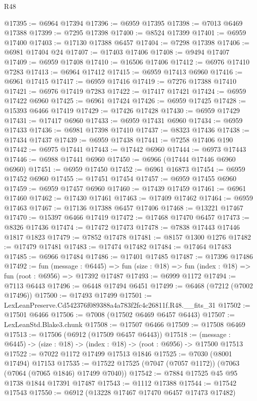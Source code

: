\begin{lexlean}{R48}
\begin{coremodule}
@17395 := @6964 @17394
@17396 := @6959 @17395
@17398 := @7013 @6469 @17388
@17399 := @7295 @17398
@17400 := @8524 @17399
@17401 := @6959 @17400
@17403 := @17130 @17388 @6457
@17404 := @7298 @17398
@17406 := @6981 @17404 @24
@17407 := @17403 @17406
@17408 := @9494 @17407
@17409 := @6959 @17408
@17410 := @16506 @17406
@17412 := @6976 @17410 @7283
@17413 := @6964 @17412
@17415 := @6959 @17413 @6960
@17416 := @6961 @17415
@17417 := @6959 @17416
@17419 := @7276 @17388 @17410
@17421 := @6976 @17419 @7283
@17422 := @17417 @17421
@17424 := @6959 @17422 @6960
@17425 := @6961 @17424
@17426 := @6959 @17425
@17428 := @15393 @6466 @17419
@17429 := @17426 @17428
@17430 := @6959 @17429
@17431 := @17417 @6960
@17433 := @6959 @17431 @6960
@17434 := @6959 @17433
@17436 := @6981 @17398 @17410
@17437 := @8323 @17436
@17438 := @17434 @17437
@17439 := @6959 @17438
@17441 := @7258 @17406 @190
@17442 := @6975 @17441
@17443 := @17442 @6960
@17444 := @6973 @17443
@17446 := @6988 @17441 @6960
@17450 := @6966 (@17444 @17446 @6960 @6960)
@17451 := @6959 @17450
@17452 := @6961 @16873
@17454 := @6959 @17452 @6960
@17455 := @17451 @17454
@17457 := @6959 @17455 @6960
@17459 := @6959 @17457 @6960
@17460 := @17439 @17459
@17461 := @6961 @17460
@17462 := @17430 @17461
@17463 := @17409 @17462
@17464 := @6959 @17463
@17467 := @17136 @17388 @6457 @17406
@17468 := @13221 @17467
@17470 := @15397 @6466 @17419
@17472 := @17468 @17470 @6457
@17473 := @8326 @17436
@17474 := @17472 @17473
@17478 := @7838 @17443 @17446 @1817 @1823
@17479 := @7852 @17478
@17481 := @8157 @1300 @1276
@17482 := @17479 @17481
@17483 := @17474 @17482
@17484 := @17464 @17483
@17485 := @6966 @17484
@17486 := @17401 @17485
@17487 := @17396 @17486
@17492 := fun (message : @6445) =>
  fun (size : @18) => fun (index : @18) => fun (root : @6956) => @17392 @17487
@17493 := @6999 @1172
@17494 := @7113 @6443
@17496 := @6448 @17494 @6451
@17499 := @6468 (@7212 (@7002 @17496))
@17500 := @17493 @17499
@17501 := LexLeanPreserve.Cd542376f089388a4a783f2fc4c26811f.R48.__fits_31
@17502 := @17501 @6466
@17506 := @7008 (@17502 @6469 @6457 @6443)
@17507 := LexLeanStd.Blake3.chunk
@17508 := @17507 @6466
@17509 := @17508 @6469
@17513 := @17506 (@6912 (@17509 @6457 @6443))
@17518 := (message : @6445) -> (size : @18) -> (index : @18) -> (root : @6956) -> @17500 @17513
@17522 := @7022 @1172 @17499 @17513 @1846
@17525 := @7030 (@8001 @17494) @17153
@17535 := @17522 @17525 (@7047 (@7057 @1172)) (@7063 (@7064 (@7065 @1846) @17499 @7040))
@17542 := @7884 @17525 @45 @95 @1738 @1844 @17391 @17487
@17543 := @1112 @17388
@17544 := @17542 @17543
@17550 := @6912 (@13228 @17467 @17470 @6457 @17473 @17482)

\end{coremodule}
\end{lexlean}
